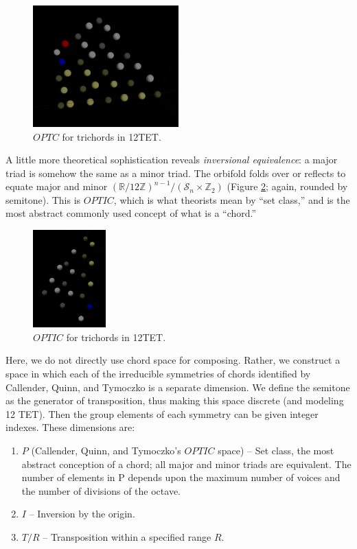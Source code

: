 \documentclass[english,11pt,letterpaper,onecolumn]{scrartcl}
\numberwithin{equation}{section}
\begin{document}
\begin{figure}
\centerline{\includegraphics[width = 0.5\textwidth]{opttc}}
\caption{\label{fig:opttc}
  $OPTC$ for trichords in 12TET.}
\end{figure}

A little more theoretical sophistication reveals \textit{inversional
equivalence}: a major triad is somehow the same as a minor triad. The orbifold
folds over or reflects to equate major and minor
$\left(\mathbb{R}/12\mathbb{Z}\right)^{n-1}/(\mathcal{S}_{n} \times
\mathbb{Z}_{2})$ (Figure \ref{fig:optic}; again, rounded by semitone). This is
$OPTIC$, which is what theorists mean by ``set class,'' and is the most abstract
commonly used concept of what is a ``chord.''

\begin{figure}
\centerline{\includegraphics[width = 0.25\textwidth]{opttic}}
\caption{\label{fig:optic}
$OPTIC$ for trichords in 12TET.}
\end{figure}

Here, we do not directly use chord space for composing. Rather, we construct a
space in which each of the irreducible symmetries of chords identified by
Callender, Quinn, and Tymoczko is a separate dimension. We define the semitone
as the generator of transposition, thus making this space discrete (and modeling
12 TET). Then the group elements of each symmetry can be given integer indexes.
These dimensions are:

\begin{enumerate}
\item $P$ (Callender, Quinn, and Tymoczko's $OPTIC$ space) -- Set class, the
most abstract conception of a chord; all major and minor triads are equivalent.
The number of elements in P depends upon the maximum number of voices and the
number of divisions of the octave.
\item $I$ -- Inversion by the origin.
\item $T/R$ -- Transposition within a specified range $R$.
\end{enumerate}
\end{document}
